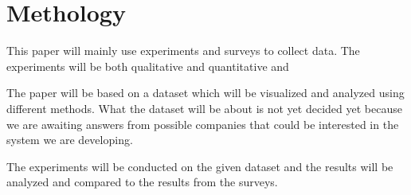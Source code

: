 \section{Methology}

This paper will mainly use experiments and surveys to collect data. 
The experiments will be both qualitative and quantitative and 

The paper will be based on a dataset which will be visualized and analyzed
using different methods. What the dataset will be about is not yet decided yet 
because we are awaiting answers from possible companies that could 
be interested in the system we are developing. 

The experiments will be conducted on the given dataset and the results
will be analyzed and compared to the results from the surveys. 

